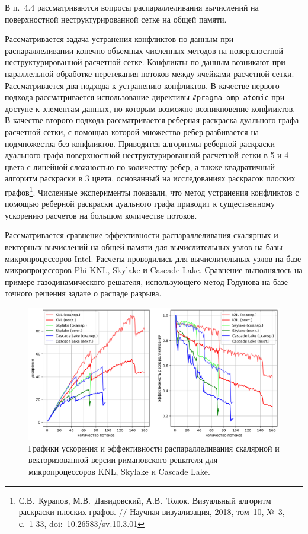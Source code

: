 \documentclass[a4paper,14pt]{extarticle}                     %
\theoremstyle{plain}                                         %
\begin{document}

В п.~4.4 рассматриваются вопросы распараллеливания вычислений на поверхностной неструктурированной сетке на общей памяти.

Рассматривается задача устранения конфликтов по данным при распараллеливании конечно-объемных численных методов на поверхностной неструктурированной расчетной сетке.
Конфликты по данным возникают при параллельной обработке перетекания потоков между ячейками расчетной сетки.
Рассматривается два подхода к устранению конфликтов.
В качестве первого подхода рассматривается использование директивы \texttt{\#pragma omp atomic} при доступе к элементам данных, по которым возможно возникновение конфликтов.
В качестве второго подхода рассматривается реберная раскраска дуального графа расчетной сетки, с помощью которой множество ребер разбивается на подмножества без конфликтов.
Приводятся алгоритмы реберной раскраски дуального графа поверхностной неструктурированной расчетной сетки в 5 и 4 цвета с линейной сложностью по количеству ребер, а также квадратичный алгоритм раскраски в 3 цвета, основанный на исследованиях раскрасок плоских графов\footnote[4]{С.В.~Курапов, М.В.~Давидовский, А.В.~Толок. Визуальный алгоритм раскраски плоских графов. // Научная визуализация, 2018, том~10, №~3, с.~1-33, doi:~10.26583/sv.10.3.01}.
Численные эксперименты показали, что метод устранения конфликтов с помощью реберной раскраски дуального графа приводит к существенному ускорению расчетов на большом количестве потоков.

Рассматривается сравнение эффективности распараллеливания скалярных и векторных вычислений на общей памяти для вычислительных узлов на базы микропроцессоров Intel.
Расчеты проводились для вычислительных узлов на базе микропроцессоров Phi KNL, Skylake и Cascade Lake.
Сравнение выполнялось на примере газодинамического решателя, использующего метод Годунова на базе точного решения задаче о распаде разрыва.

\begin{figure}[ht]
\centering
\includegraphics[width=1.0\textwidth]{./fig/par_openmp_scalar_vec_chart.png}
\singlespacing
\caption{Графики ускорения и эффективности распараллеливания скалярной и векторизованной версии римановского решателя для микропроцессоров KNL, Skylake и Cascade Lake.}
\label{fig:text_3_omp2}
\end{figure}
\end{document}
